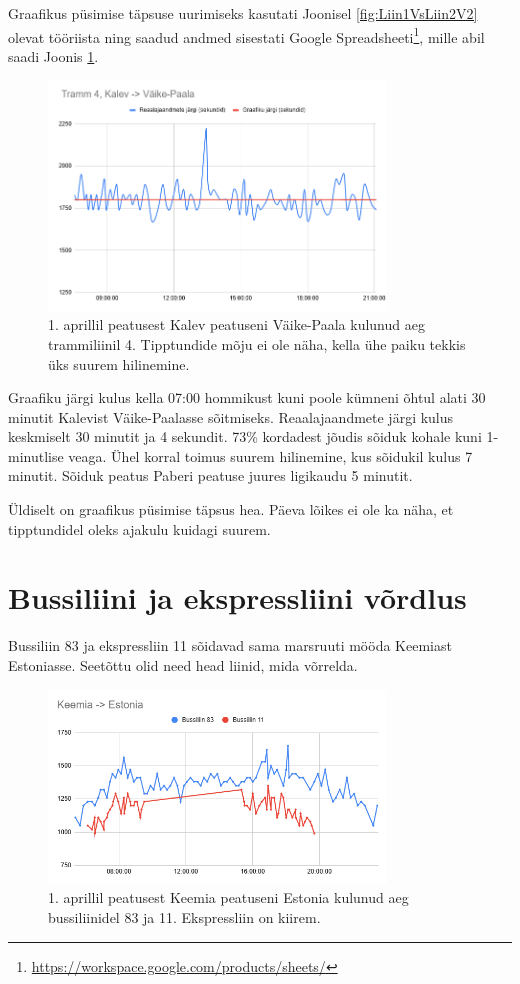 Graafikus püsimise täpsuse uurimiseks kasutati Joonisel \ref{fig:Liin1VsLiin2V2} olevat tööriista ning saadud andmed sisestati Google Spreadsheeti\footnote{\url{https://workspace.google.com/products/sheets/}}, mille abil saadi Joonis \ref{fig:kalevVaikePaala}.
\begin{figure}[h!]
    \centering
    \includegraphics[width=0.8\textwidth]{figures/kalev-vaikepaala-kiirused.png}
    \caption{1. aprillil peatusest Kalev peatuseni Väike-Paala kulunud aeg trammiliinil 4. Tipptundide mõju ei ole näha, kella ühe paiku tekkis üks suurem hilinemine.}
    \label{fig:kalevVaikePaala}
\end{figure}
Graafiku järgi kulus kella 07:00 hommikust kuni poole kümneni õhtul alati 30 minutit Kalevist Väike-Paalasse sõitmiseks. Reaalajaandmete järgi kulus keskmiselt 30 minutit ja 4 sekundit. 73\% kordadest jõudis sõiduk kohale kuni 1-minutlise veaga. Ühel korral toimus suurem hilinemine, kus sõidukil kulus 7 minutit. Sõiduk peatus Paberi peatuse juures ligikaudu 5 minutit.

Üldiselt on graafikus püsimise täpsus hea. Päeva lõikes ei ole ka näha, et tipptundidel oleks ajakulu kuidagi suurem.

\section{Bussiliini ja ekspressliini võrdlus}

Bussiliin 83 ja ekspressliin 11 sõidavad sama marsruuti mööda Keemiast Estoniasse. Seetõttu olid need head liinid, mida võrrelda.
\begin{figure}[h!]
    \centering
    \includegraphics[width=0.8\textwidth]{figures/keemia-estonia.png}
    \caption{1. aprillil peatusest Keemia peatuseni Estonia kulunud aeg bussiliinidel 83 ja 11. Ekspressliin on kiirem.}
    \label{fig:keemiaEstonia}
\end{figure}

